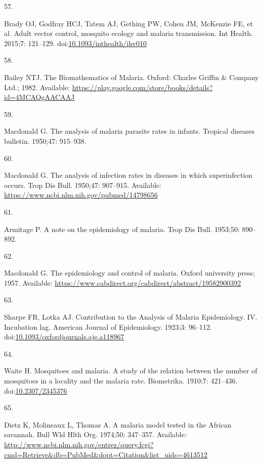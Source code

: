 \documentclass[
]{book}
\newlength{\cslhangindent}
\newlength{\csllabelwidth}
\newenvironment{CSLReferences}[2] %
 {\begin{list}{}{%
  \setlength{\itemindent}{0pt}
  \setlength{\leftmargin}{0pt}
  \setlength{\parsep}{0pt}
  \ifodd #1
   \setlength{\leftmargin}{\cslhangindent}
   \setlength{\itemindent}{-1\cslhangindent}
  \fi
  \setlength{\itemsep}{#2\baselineskip}}}
 {\end{list}}
\newcommand{\CSLLeftMargin}[1]{\parbox[t]{\csllabelwidth}{\strut#1\strut}}
\newcommand{\CSLRightInline}[1]{\parbox[t]{\linewidth - \csllabelwidth}{\strut#1\strut}}
\begin{document}
\begin{CSLReferences}{0}{1}
\CSLLeftMargin{57. }%
\CSLRightInline{Brady OJ, Godfray HCJ, Tatem AJ, Gething PW, Cohen JM, McKenzie FE, et al. Adult vector control, mosquito ecology and malaria transmission. Int Health. 2015;7: 121--129. doi:\href{https://doi.org/10.1093/inthealth/ihv010}{10.1093/inthealth/ihv010}}

\CSLLeftMargin{58. }%
\CSLRightInline{Bailey NTJ. The {Biomathematics} of {Malaria}. {Oxford}: {Charles Griffin \& Company Ltd.}; 1982. Available: \url{https://play.google.com/store/books/details?id=4MCAQgAACAAJ}}

\CSLLeftMargin{59. }%
\CSLRightInline{Macdonald G. The analysis of malaria parasite rates in infants. Tropical diseases bulletin. 1950;47: 915--938. }

\CSLLeftMargin{60. }%
\CSLRightInline{Macdonald G. The analysis of infection rates in diseases in which superinfection occurs. Trop Dis Bull. 1950;47: 907--915. Available: \url{https://www.ncbi.nlm.nih.gov/pubmed/14798656}}

\CSLLeftMargin{61. }%
\CSLRightInline{Armitage P. A note on the epidemiology of malaria. Trop Dis Bull. 1953;50: 890--892. }

\CSLLeftMargin{62. }%
\CSLRightInline{Macdonald G. The epidemiology and control of malaria. {Oxford university press}; 1957. Available: \url{https://www.cabdirect.org/cabdirect/abstract/19582900392}}

\CSLLeftMargin{63. }%
\CSLRightInline{Sharpe FR, Lotka AJ. Contribution to the {Analysis} of {Malaria Epidemiology}. {IV}. {Incubation} lag. American Journal of Epidemiology. 1923;3: 96--112. doi:\href{https://doi.org/10.1093/oxfordjournals.aje.a118967}{10.1093/oxfordjournals.aje.a118967}}

\CSLLeftMargin{64. }%
\CSLRightInline{Waite H. Mosquitoes and malaria. {A} study of the relation between the number of mosquitoes in a locality and the malaria rate. Biometrika. 1910;7: 421--436. doi:\href{https://doi.org/10.2307/2345376}{10.2307/2345376}}

\CSLLeftMargin{65. }%
\CSLRightInline{Dietz K, Molineaux L, Thomas A. A malaria model tested in the {African} savannah. Bull Wld Hlth Org. 1974;50: 347--357. Available: \url{http://www.ncbi.nlm.nih.gov/entrez/query.fcgi?cmd=Retrieve&db=PubMed&dopt=Citation&list_uids=4613512}}


\end{CSLReferences}
\end{document}
